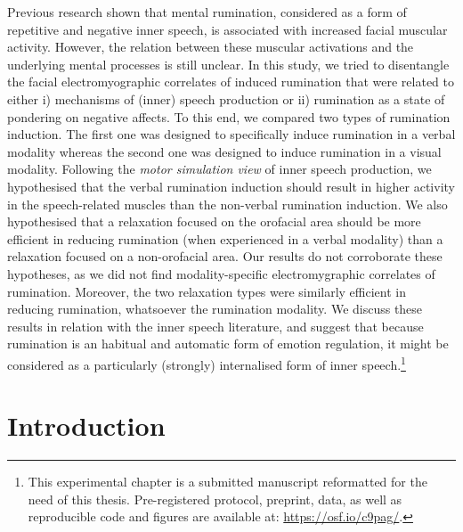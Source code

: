 \documentclass[a4paper,12pt,twoside,openright,oldfontcommands]{memoir}
\let\rmarkdownfootnote\footnote%
\def\footnote{\protect\rmarkdownfootnote}
\newcommand{\initial}[1]{
	\lettrine[lines=3,lhang=0.33,nindent=0em]{
		\color{gray}
     		{\textsc{#1}}}{}}
\begin{document}
\initial{P}revious research shown that mental rumination, considered as a form of repetitive and negative inner speech, is associated with increased facial muscular activity. However, the relation between these muscular activations and the underlying mental processes is still unclear. In this study, we tried to disentangle the facial electromyographic correlates of induced rumination that were related to either i) mechanisms of (inner) speech production or ii) rumination as a state of pondering on negative affects. To this end, we compared two types of rumination induction. The first one was designed to specifically induce rumination in a verbal modality whereas the second one was designed to induce rumination in a visual modality. Following the \emph{motor simulation view} of inner speech production, we hypothesised that the verbal rumination induction should result in higher activity in the speech-related muscles than the non-verbal rumination induction. We also hypothesised that a relaxation focused on the orofacial area should be more efficient in reducing rumination (when experienced in a verbal modality) than a relaxation focused on a non-orofacial area. Our results do not corroborate these hypotheses, as we did not find modality-specific electromygraphic correlates of rumination. Moreover, the two relaxation types were similarly efficient in reducing rumination, whatsoever the rumination modality. We discuss these results in relation with the inner speech literature, and suggest that because rumination is an habitual and automatic form of emotion regulation, it might be considered as a particularly (strongly) internalised form of inner speech.\footnote{This experimental chapter is a submitted manuscript reformatted for the need of this thesis. Pre-registered protocol, preprint, data, as well as reproducible code and figures are available at: \url{https://osf.io/c9pag/}.}

\hypertarget{introduction-1}{%
\section{Introduction}\label{introduction-1}}
\end{document}
